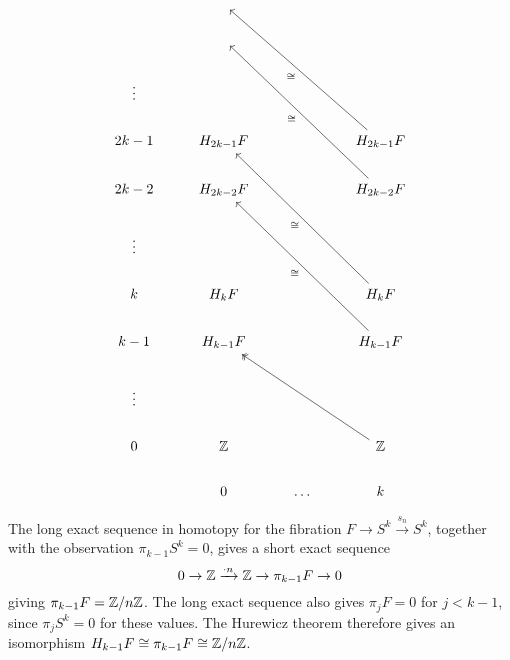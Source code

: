 \begin{example}
\[\begin{tikzcd}
       & {}        &       &                                 \\
       & {}        &       &                                 \\
\vdots &           &       &                                 \\
2k-1   & H_{2k-1}F &       & H_{2k-1}F \arrow[lluuu, "\iso"] \\
2k-2   & H_{2k-2}F &       & H_{2k-2}F \arrow[lluuu, "\iso"] \\
\vdots &           &       &                                 \\
k      & H_kF      &       & H_kF \arrow[lluuu, "\iso"]      \\
k-1    & H_{k-1}F  &       & H_{k-1}F \arrow[lluuu, "\iso"]  \\
\vdots &           &       &                                 \\
0      & \Z        &       & \Z \arrow[lluu, two heads]      \\
       & 0         & \dots & k                              
\end{tikzcd}\]

The long exact sequence in homotopy for the fibration $F\rightarrow S^k\xrightarrow{s_n} S^k$, together with the observation $\pi_{k-1}S^k=0$, gives a short exact sequence
$$0\rightarrow \mathbb{Z} \xrightarrow[]{\cdot n}\mathbb{Z}\rightarrow \pi_{k-1}F\rightarrow 0$$
giving $\pi_{k-1}F=\mathbb{Z}/n\mathbb{Z}$. The long exact sequence also gives $\pi_jF=0$ for $j<k-1$, since $\pi_j S^k=0$ for these values. The Hurewicz theorem therefore gives an isomorphism $H_{k-1}F\cong \pi_{k-1}F\cong \mathbb{Z}/n\mathbb{Z}$.


\end{example}
